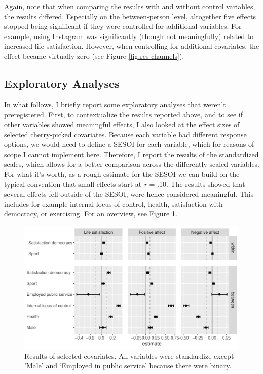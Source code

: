 \documentclass[
  english,
  man,mask,floatsintext]{apa6}
\begin{document}
Again, note that when comparing the results with and without control variables, the results differed.
Especially on the between-person level, altogether five effects stopped being significant if they were controlled for additional variables.
For example, using Instagram was significantly (though not meaningfully) related to increased life satisfaction.
However, when controlling for additional covariates, the effect became virtually zero (see Figure \ref{fig:res-channels}).

\hypertarget{exploratory-analyses}{%
\subsection{Exploratory Analyses}\label{exploratory-analyses}}

In what follows, I briefly report some exploratory analyses that weren't preregistered.
First, to contextualize the results reported above, and to see if other variables showed meaningful effects, I also looked at the effect sizes of selected cherry-picked covariates.
Because each variable had different response options, we would need to define a SESOI for each variable, which for reasons of scope I cannot implement here.
Therefore, I report the results of the standardized scales,
which allows for a better comparison across the differently scaled variables.
For what it's worth, as a rough estimate for the SESOI we can build on the typical convention that small effects start at \emph{r} = \textbar.10\textbar.
The results showed that several effects fell outside of the SESOI, were hence considered meaningful.
This includes for example internal locus of control, health, satisfaction with democracy, or exercising.
For an overview, see Figure \ref{fig:res-control}.

\begin{figure}
\includegraphics[width=\textwidth]{figures/fig_results_control_std} \caption{Results of selected covariates. All variables were standardize except 'Male'  and ‘Employed in public service' because there were binary.}\label{fig:res-control}
\end{figure}
\end{document}
